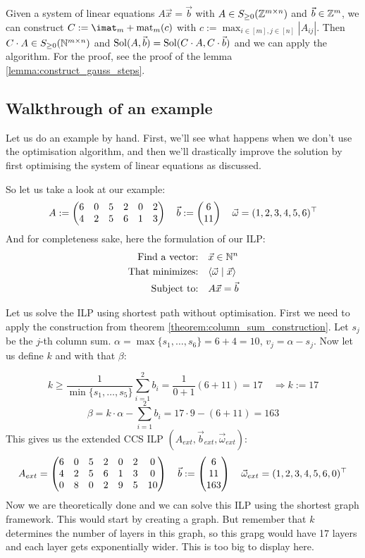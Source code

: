 Given a system of linear equations $A\vec x = \vec b$ with $A \in S_{\geq 0}(\mathbb{Z}^{m \times n})$ and $\vec b \in \mathbb{Z}^{m}$, we can construct $C := \imat_m + \opmat_m(c)$ with $c := \max_{i\in[m], j\in[n]} |A_{ij}|$. Then $C \cdot A \in S_{\geq 0}(\mathbb{N}^{m \times n})$ and $\operatorname{Sol}(A, \vec b) = \operatorname{Sol}(C\cdot A, C\cdot \vec b)$ and we can apply the algorithm. For the proof, see the proof of the lemma \ref{lemma:construct_gauss_steps}.
   
\subsection{Walkthrough of an example}
Let us do an example by hand. First, we'll see what happens when we don't use the optimisation algorithm, and then we'll drastically improve the solution by first optimising the system of linear equations as discussed.

So let us take a look at our example:
$$A:= \left(\begin{matrix}6&0&5&2&0&2\\4&2&5&6&1&3\end{matrix}\right)\quad\vec b:= \left(\begin{matrix}6\\11\end{matrix}\right) \quad \vec\omega = (1, 2, 3, 4, 5, 6)^\top$$
And for completeness sake, here the formulation of our ILP:
\begin{align*}
    \text{Find a vector:} & \quad \vec x \in \mathbb{N}^n \\
    \text{That minimizes:} & \quad \langle \vec \omega \mid \vec x \rangle\\
    \text{Subject to:} & \quad A\vec x = \vec b \\
\end{align*}

Let us solve the ILP using shortest path without optimisation. First we need to apply the construction from theorem \ref{theorem:column_sum_construction}. Let $s_j$ be the $j$-th column sum. $\alpha = \max\{s_1, \dots, s_6\} = 6+4=10$, $v_j = \alpha - s_j$. Now let us define $k$ and with that $\beta$:

$$k \geq \frac{1}{\min\{s_1, \dots, s_5\}} \sum_{i=1}^{2}b_i = \frac{1}{0+1}(6+11) = 17 \quad \Rightarrow k := 17$$ 
$$\beta = k\cdot\alpha - \sum_{i=1}^{2}b_i = 17\cdot9-(6+11) = 163$$
This gives us the extended CCS ILP $(A_{ext}, \vec b_{ext}, \vec\omega_{ext})$:
$$A_{ext} = \left(\begin{matrix}6&0&5&2&0&2&0\\4&2&5&6&1&3&0\\0&8&0&2&9&5&10\end{matrix}\right)\quad\vec b:= \left(\begin{matrix}6\\11\\163\end{matrix}\right)\quad \vec\omega_{ext} = (1, 2, 3, 4, 5, 6, 0)^\top$$
Now we are theoretically done and we can solve this ILP using the shortest graph framework. This would start by creating a graph. But remember that $k$ determines the number of layers in this graph, so this grapg would have 17 layers and each layer gets exponentially wider. This is too big to display here.

